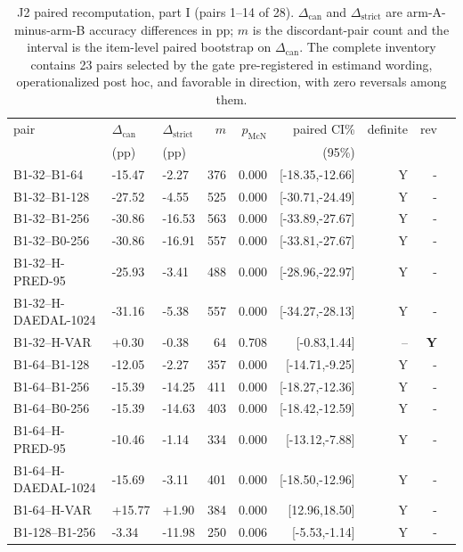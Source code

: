 \documentclass{article}
\begin{document}
\begin{table}[H]
\centering\footnotesize
\setlength{\tabcolsep}{2pt}
\begin{tabular}{lllrrrrrr}
\toprule
pair & $\Delta_{\mathrm{can}}$ & $\Delta_{\mathrm{strict}}$ & $m$ & $p_{\mathrm{McN}}$ & paired CI\% & definite & rev \\
      & (pp) & (pp) & & & (95\%) & & \\
\midrule
B1-32--B1-64 & -15.47 & -2.27 & 376 & 0.000 & [-18.35,-12.66] & Y & - \\
B1-32--B1-128 & -27.52 & -4.55 & 525 & 0.000 & [-30.71,-24.49] & Y & - \\
B1-32--B1-256 & -30.86 & -16.53 & 563 & 0.000 & [-33.89,-27.67] & Y & - \\
B1-32--B0-256 & -30.86 & -16.91 & 557 & 0.000 & [-33.81,-27.67] & Y & - \\
B1-32--H-PRED-95 & -25.93 & -3.41 & 488 & 0.000 & [-28.96,-22.97] & Y & - \\
B1-32--H-DAEDAL-1024 & -31.16 & -5.38 & 557 & 0.000 & [-34.27,-28.13] & Y & - \\
B1-32--H-VAR & +0.30 & -0.38 & 64 & 0.708 & [-0.83,1.44] & -- & \textbf{Y} \\
B1-64--B1-128 & -12.05 & -2.27 & 357 & 0.000 & [-14.71,-9.25] & Y & - \\
B1-64--B1-256 & -15.39 & -14.25 & 411 & 0.000 & [-18.27,-12.36] & Y & - \\
B1-64--B0-256 & -15.39 & -14.63 & 403 & 0.000 & [-18.42,-12.59] & Y & - \\
B1-64--H-PRED-95 & -10.46 & -1.14 & 334 & 0.000 & [-13.12,-7.88] & Y & - \\
B1-64--H-DAEDAL-1024 & -15.69 & -3.11 & 401 & 0.000 & [-18.50,-12.96] & Y & - \\
B1-64--H-VAR & +15.77 & +1.90 & 384 & 0.000 & [12.96,18.50] & Y & - \\
B1-128--B1-256 & -3.34 & -11.98 & 250 & 0.006 & [-5.53,-1.14] & Y & - \\
\bottomrule
\end{tabular}
\caption{J2 paired recomputation, part I (pairs 1--14 of 28).
$\Delta_{\mathrm{can}}$ and $\Delta_{\mathrm{strict}}$ are arm-A-minus-arm-B
accuracy differences in pp; $m$ is the discordant-pair count and the interval
is the item-level paired bootstrap on $\Delta_{\mathrm{can}}$.  The complete
inventory contains 23 pairs selected by the gate pre-registered in estimand
wording, operationalized post hoc, and favorable in direction, with zero
reversals among them.}
\label{tab:appx_j2}
\end{table}
\end{document}
